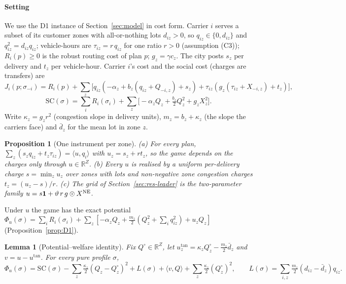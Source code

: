 \documentclass[preprint,11pt]{elsarticle}
\newtheorem{lemma}[theorem]{Lemma}
\newtheorem{proposition}[theorem]{Proposition}
\theoremstyle{definition}
\theoremstyle{remark}
\newcommand{\R}{\mathbb{R}}
\newcommand{\ip}[2]{\langle #1,#2\rangle}
\begin{document}
\paragraph{Setting} We use the D1 instance of Section~\ref{sec:model} in cost form. Carrier $i$ serves a subset of its customer zones with all-or-nothing lots $d_{iz}>0$, so $q_{iz}\in\{0,d_{iz}\}$ and $q_{iz}^2=d_{iz}q_{iz}$; vehicle-hours are $\tau_{iz}=r\,q_{iz}$ for one ratio $r>0$ (assumption (C3)); $R_i(p)\ge0$ is the robust routing cost of plan $p$; $g_z=\gamma c_z$. The city posts $s_z$ per delivery and $t_z$ per vehicle-hour. Carrier $i$'s cost and the social cost (charges are transfers) are
\[
J_i(p;\sigma_{-i})=R_i(p)+\sum_z\big[q_{iz}(-\alpha_z+b_z(q_{iz}+Q_{-i,z})+s_z)+\tau_{iz}(g_z(\tau_{iz}+X_{-i,z})+t_z)\big],
\]
\[
\mathrm{SC}(\sigma)=\sum_iR_i(\sigma_i)+\sum_z\big[-\alpha_zQ_z+\tfrac{b_z}{2}Q_z^2+g_zX_z^2\big].
\]
Write $\kappa_z=g_zr^2$ (congestion slope in delivery units), $m_z=b_z+\kappa_z$ (the slope the carriers face) and $\bar d_z$ for the mean lot in zone $z$.

\begin{proposition}[One instrument per zone]\label{prop:instr}
(a) For every plan, $\sum_z(s_zq_{iz}+t_z\tau_{iz})=\ip{u}{q_i}$ with $u_z=s_z+rt_z$, so the game depends on the charges only through $u\in\R^Z$. (b) Every $u$ is realised by a uniform per-delivery charge $s=\min_zu_z$ over zones with lots and non-negative zone congestion charges $t_z=(u_z-s)/r$. (c) The grid of Section~\ref{sec:res-leader} is the two-parameter family $u=s\mathbf 1+\vartheta\,r\,g\odot X^{\rm NE}$.
\end{proposition}

Under $u$ the game has the exact potential $\Phi_u(\sigma)=\sum_iR_i(\sigma_i)+\sum_z[-\alpha_zQ_z+\tfrac{m_z}{2}(Q_z^2+\sum_iq_{iz}^2)+u_zQ_z]$ (Proposition~\ref{prop:D1}).

\begin{lemma}[Potential--welfare identity]\label{lem:identity}
Fix $Q^\circ\in\R^Z$, let $u^{\tan}_z=\kappa_zQ^\circ_z-\tfrac{m_z}{2}\bar d_z$ and $v=u-u^{\tan}$. For every pure profile $\sigma$,
\[
\Phi_u(\sigma)=\mathrm{SC}(\sigma)-\sum_z\tfrac{\kappa_z}{2}(Q_z-Q^\circ_z)^2+L(\sigma)+\ip{v}{Q}+\sum_z\tfrac{\kappa_z}{2}(Q^\circ_z)^2,\qquad L(\sigma)=\sum_{i,z}\tfrac{m_z}{2}(d_{iz}-\bar d_z)q_{iz}.
\]
\end{lemma}
\end{document}
